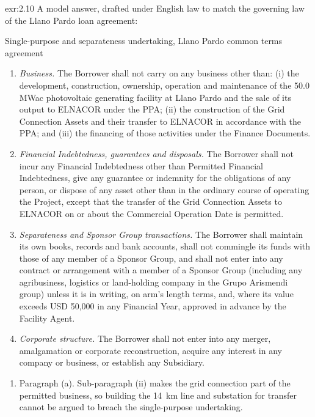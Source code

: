 \begin{solution}{exr:2.10}
A model answer, drafted under English law to match the governing law of the Llano Pardo loan agreement:
\begin{clause}{Single-purpose and separateness undertaking, Llano Pardo common terms agreement \illustrative}\label{cl:2.2}
\begin{enumerate}[label=(\alph*)]
\item \emph{Business.} The Borrower shall not carry on any business other than: (i) the development, construction, ownership, operation and maintenance of the 50.0 MWac photovoltaic generating facility at Llano Pardo and the sale of its output to ELNACOR under the PPA; (ii) the construction of the Grid Connection Assets and their transfer to ELNACOR in accordance with the PPA; and (iii) the financing of those activities under the Finance Documents.
\item \emph{Financial Indebtedness, guarantees and disposals.} The Borrower shall not incur any Financial Indebtedness other than Permitted Financial Indebtedness, give any guarantee or indemnity for the obligations of any person, or dispose of any asset other than in the ordinary course of operating the Project, except that the transfer of the Grid Connection Assets to ELNACOR on or about the Commercial Operation Date is permitted.
\item \emph{Separateness and Sponsor Group transactions.} The Borrower shall maintain its own books, records and bank accounts, shall not commingle its funds with those of any member of a Sponsor Group, and shall not enter into any contract or arrangement with a member of a Sponsor Group (including any agribusiness, logistics or land-holding company in the Grupo Arismendi group) unless it is in writing, on arm's length terms, and, where its value exceeds USD 50,000 in any Financial Year, approved in advance by the Facility Agent.
\item \emph{Corporate structure.} The Borrower shall not enter into any merger, amalgamation or corporate reconstruction, acquire any interest in any company or business, or establish any Subsidiary.
\end{enumerate}
\end{clause}
\begin{enumerate}
\item Paragraph (a). Sub-paragraph (ii) makes the grid connection part of the permitted business, so building the 14~km line and substation for transfer cannot be argued to breach the single-purpose undertaking.

\end{enumerate}
\end{solution}
